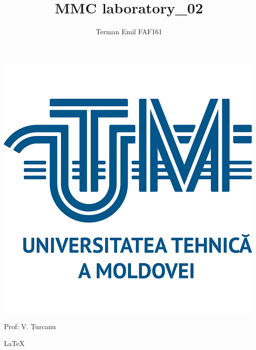 \documentclass{article}
\begin{document}
		\makeatletter
		\newenvironment{sqcases} {
			\matrix@check\sqcases\env@sqcases
		}{
			\endarray \right.
		}
		\def\env@sqcases {
			\let \@ifnextchar \new@ifnextchar
			\left \lbrack
			\def \arraystretch{1.2}
			\array{@{}l@{\quad}l@{}}
		}
		\makeatother

		\newcommand\hr{\par\vspace{-.5\ht\strutbox}\noindent\hrulefill\par}


	\title{MMC laboratory\_02}
	\author{Terman Emil FAF161}
	\maketitle
	
	\begin{center}
	\includegraphics{imgs/UTM_logo.png}
	\end{center}
	\begin{flushright}
		Prof: V. Țurcanu
	\end{flushright}
	\begin{center}
	\LaTeX
	\end{center}
	\pagebreak %
	
\end{document}
